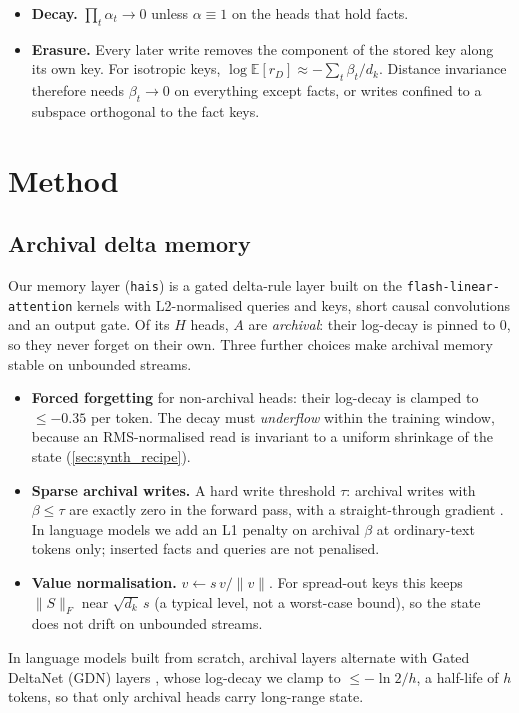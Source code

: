 \documentclass[11pt]{article}
\newcommand{\tauw}{\tau}
\begin{document}
\begin{itemize}
\item \textbf{Decay.} $\prod_t \alpha_t \to 0$ unless $\alpha \equiv 1$ on the heads that hold facts.
\item \textbf{Erasure.} Every later write removes the component of the stored key along its own key. For isotropic keys, $\log \mathbb{E}[r_D] \approx -\sum_t \beta_t / d_k$. Distance invariance therefore needs $\beta_t \to 0$ on everything except facts, or writes confined to a subspace orthogonal to the fact keys.
\end{itemize}

\section{Method}
\label{sec:method}
\subsection{Archival delta memory}
\label{sec:hais}
Our memory layer (\texttt{hais}) is a gated delta-rule layer built on the \texttt{flash-linear-attention} kernels \citep{fla} with L2-normalised queries and keys, short causal convolutions and an output gate. Of its $H$ heads, $A$ are \emph{archival}: their log-decay is pinned to $0$, so they never forget on their own. Three further choices make archival memory stable on unbounded streams.
\begin{itemize}
\item \textbf{Forced forgetting} for non-archival heads: their log-decay is clamped to $\le -0.35$ per token. The decay must \emph{underflow} within the training window, because an RMS-normalised read is invariant to a uniform shrinkage of the state (\cref{sec:synth_recipe}).
\item \textbf{Sparse archival writes.} A hard write threshold $\tauw$: archival writes with $\beta \le \tauw$ are exactly zero in the forward pass, with a straight-through gradient \citep{ste2013}. In language models we add an L1 penalty on archival $\beta$ at ordinary-text tokens only; inserted facts and queries are not penalised.
\item \textbf{Value normalisation.} $v \leftarrow s\, v / \lVert v\rVert$. For spread-out keys this keeps $\lVert S\rVert_F$ near $\sqrt{d_k}\, s$ (a typical level, not a worst-case bound), so the state does not drift on unbounded streams.
\end{itemize}
In language models built from scratch, archival layers alternate with Gated DeltaNet (GDN) layers \citep{gdn2024}, whose log-decay we clamp to $\le -\ln 2 / h$, a half-life of $h$ tokens, so that only archival heads carry long-range state.
\end{document}
